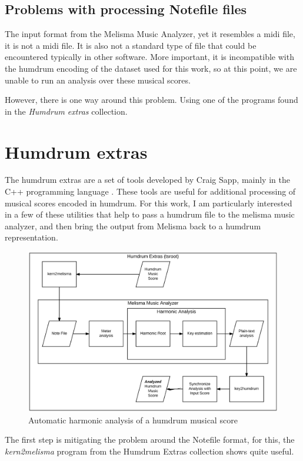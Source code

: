   \subsection{Problems with processing Notefile files}
    The input format from the Melisma Music Analyzer, yet it resembles a midi file, it is not a midi file. It is also not a standard type of file that could be encountered typically in other software. More important, it is incompatible with the humdrum encoding of the dataset used for this work, so at this point, we are unable to run an analysis over these musical scores.

    However, there is one way around this problem. Using one of the programs found in the \emph{Humdrum extras} collection.

\section{Humdrum extras}
  The humdrum extras are a set of tools developed by Craig Sapp, mainly in the C++ programming language \cite{humextra}. These tools are useful for additional processing of musical scores encoded in humdrum. For this work, I am particularly interested in a few of these utilities that help to pass a humdrum file to the melisma music analyzer, and then bring the output from Melisma back to a humdrum representation.

  \begin{figure}[ht]
    \centering
      \includegraphics[width=1.0\textwidth]{04-methodology/figures/3}
    \caption{Automatic harmonic analysis of a humdrum musical score}
    \label{fig:software_stack3}
  \end{figure}

  The first step is mitigating the problem around the Notefile format, for this, the \emph{kern2melisma} program from the Humdrum Extras collection shows quite useful.

